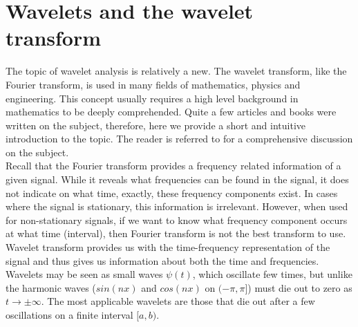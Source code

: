 %

\chapter{Wavelets and the wavelet transform}
\label{app:wavelets}

The topic of wavelet analysis is relatively a new. The wavelet transform, like the Fourier transform, is used in many fields of mathematics, physics and engineering. This concept usually requires a high level background in mathematics to be deeply comprehended. Quite a few articles and books were written on the subject, therefore, here we provide a short and intuitive introduction to the topic. The reader is referred to \cite{meyer1992wavelets} for a comprehensive discussion on the subject.\\ 

Recall that the Fourier transform provides a frequency related information of a given signal. While it reveals what frequencies can be found in the signal, it does not indicate on what time, exactly, these frequency components exist. In cases where the signal is stationary, this information is irrelevant. However, when used for non-stationary signals, if we want to know what frequency component occurs at what time (interval), then Fourier transform is not the best transform to use. Wavelet transform provides us with the time-frequency representation of the signal and thus gives us information about both the time and frequencies.\\

Wavelets may be seen as small waves $\psi(t)$, which oscillate few times, but unlike the harmonic waves ($sin(nx)$ and $cos(nx)$ on $(-\pi,\pi]$) must die out to zero as $t \rightarrow \pm\infty$. The most applicable wavelets are those that die out after a few oscillations on a finite interval $[a,b)$. \\

